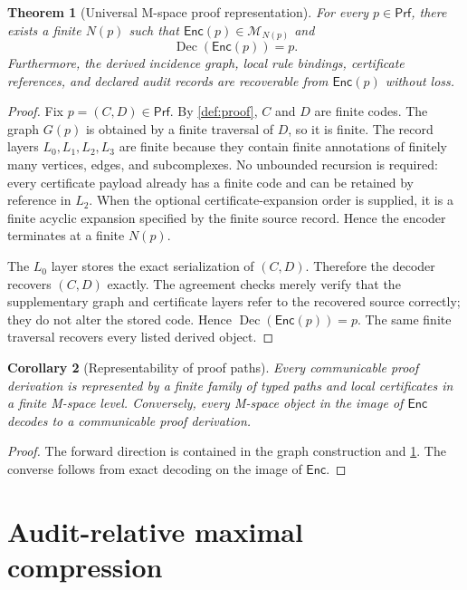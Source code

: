\documentclass[11pt]{article}
\newcommand{\Dec}{\ensuremath{\operatorname{Dec}}}
\newcommand{\Prf}{\mathsf{Prf}}
\newcommand{\M}{\mathcal M}
\newcommand{\Enc}{\mathsf{Enc}}
\theoremstyle{plain}
\newtheorem{theorem}{Theorem}[section]
\newtheorem{corollary}[theorem]{Corollary}
\theoremstyle{definition}
\theoremstyle{remark}
\begin{document}
\begin{theorem}[Universal M-space proof representation]
\label{thm:universal-representation}
For every $p\in\Prf$, there exists a finite $N(p)$ such that $\Enc(p)\in\M_{N(p)}$ and
\[
  \Dec(\Enc(p))=p.
\]
Furthermore, the derived incidence graph, local rule bindings, certificate references, and declared audit records are recoverable from $\Enc(p)$ without loss.
\end{theorem}

\begin{proof}
Fix $p=(C,D)\in\Prf$.  By \cref{def:proof}, $C$ and $D$ are finite codes.  The graph $G(p)$ is obtained by a finite traversal of $D$, so it is finite.  The record layers $L_0,L_1,L_2,L_3$ are finite because they contain finite annotations of finitely many vertices, edges, and subcomplexes.  No unbounded recursion is required: every certificate payload already has a finite code and can be retained by reference in $L_2$.  When the optional certificate-expansion order is supplied, it is a finite acyclic expansion specified by the finite source record.  Hence the encoder terminates at a finite $N(p)$.

The $L_0$ layer stores the exact serialization of $(C,D)$.  Therefore the decoder recovers $(C,D)$ exactly.  The agreement checks merely verify that the supplementary graph and certificate layers refer to the recovered source correctly; they do not alter the stored code.  Hence $\Dec(\Enc(p))=p$.  The same finite traversal recovers every listed derived object.
\end{proof}

\begin{corollary}[Representability of proof paths]
\label{cor:paths}
Every communicable proof derivation is represented by a finite family of typed paths and local certificates in a finite M-space level.  Conversely, every M-space object in the image of $\Enc$ decodes to a communicable proof derivation.
\end{corollary}

\begin{proof}
The forward direction is contained in the graph construction and \cref{thm:universal-representation}.  The converse follows from exact decoding on the image of $\Enc$.
\end{proof}

\section{Audit-relative maximal compression}
\label{sec:compression}
\end{document}
